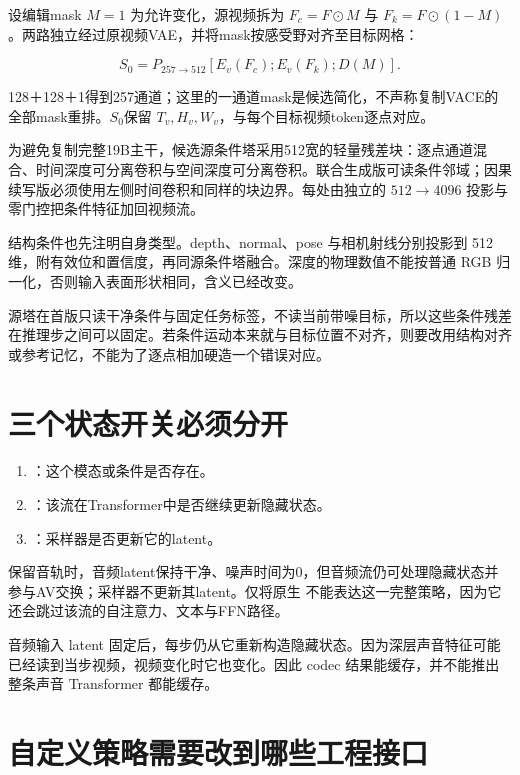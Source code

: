 设编辑mask \(M=1\) 为允许变化，源视频拆为 \(F_c=F\odot M\) 与 \(F_k=F\odot(1-M)\)。两路独立经过原视频VAE，并将mask按感受野对齐至目标网格：

\[
S_0=P_{257\rightarrow512}
[E_v(F_c);E_v(F_k);D(M)].
\]

128＋128＋1得到257通道；这里的一通道mask是候选简化，不声称复制VACE的全部mask重排。\(S_0\)保留 \(T_v,H_v,W_v\)，与每个目标视频token逐点对应。

为避免复制完整19B主干，候选源条件塔采用512宽的轻量残差块：逐点通道混合、时间深度可分离卷积与空间深度可分离卷积。联合生成版可读条件邻域；因果续写版必须使用左侧时间卷积和同样的块边界。每处由独立的 \(512\rightarrow4096\) 投影与零门控把条件特征加回视频流。

结构条件也先注明自身类型。depth、normal、pose 与相机射线分别投影到 512 维，附有效位和置信度，再同源条件塔融合。深度的物理数值不能按普通 RGB 归一化，否则输入表面形状相同，含义已经改变。

源塔在首版只读干净条件与固定任务标签，不读当前带噪目标，所以这些条件残差在推理步之间可以固定。若条件运动本来就与目标位置不对齐，则要改用结构对齐或参考记忆，不能为了逐点相加硬造一个错误对应。

\section{三个状态开关必须分开}\label{seedance-m21-ux4e09ux4e2aux72b6ux6001ux5f00ux5173ux5fc5ux987bux5206ux5f00}

\begin{enumerate}
\def\labelenumi{\arabic{enumi}.}
\tightlist
\item
  ：这个模态或条件是否存在。
\item
  ：该流在Transformer中是否继续更新隐藏状态。
\item
  ：采样器是否更新它的latent。
\end{enumerate}

保留音轨时，音频latent保持干净、噪声时间为0，但音频流仍可处理隐藏状态并参与AV交换；采样器不更新其latent。仅将原生  不能表达这一完整策略，因为它还会跳过该流的自注意力、文本与FFN路径。

音频输入 latent 固定后，每步仍从它重新构造隐藏状态。因为深层声音特征可能已经读到当步视频，视频变化时它也变化。因此 codec 结果能缓存，并不能推出整条声音 Transformer 都能缓存。

\section{自定义策略需要改到哪些工程接口}\label{seedance-m21-ux81eaux5b9aux4e49ux7b56ux7565ux9700ux8981ux6539ux5230ux54eaux4e9bux5de5ux7a0bux63a5ux53e3}

